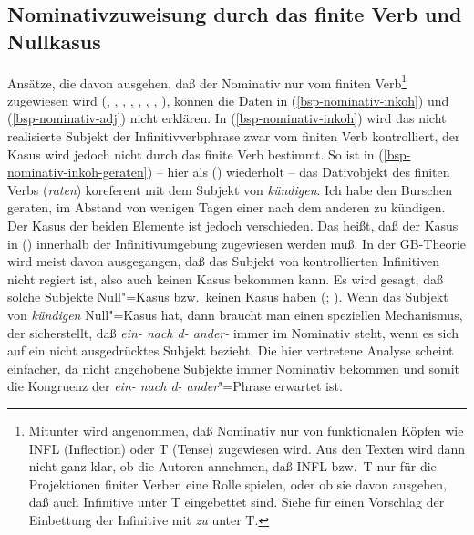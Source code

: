 \subsection{Nominativzuweisung durch das finite Verb und Nullkasus}
\label{sec-kasus-fin-verb-nullkasus}

Ansätze, die davon ausgehen, daß der Nominativ nur vom finiten Verb\footnote{
  Mitunter wird angenommen, daß Nominativ nur von funktionalen Köpfen wie INFL (Inflection) oder T (Tense) zugewiesen
  wird. Aus den Texten wird dann nicht ganz klar, ob die Autoren annehmen, daß INFL bzw.\ T nur für
  die Projektionen finiter Verben eine Rolle spielen, oder ob sie davon ausgehen, daß auch
  Infinitive unter T eingebettet sind. Siehe \citet[]{Wurmbrand2003a} für einen Vorschlag der Einbettung
  der Infinitive mit \emph{zu} unter T.%
} zugewiesen wird
%
(\citealp[]{Chomsky93a}, \citealp[]{Haider84b}, \citealp[]{FF87a},
\citealp[]{Bierwisch90a}, \citealp{Molnarfi98a},
\citealp*[]{BBM2001a}, \citealp[]{Eroms2000a}, \citealp[, , ]{Abraham2005a}), 
können die Daten in (\ref{bsp-nominativ-inkoh}) und (\ref{bsp-nominativ-adj}) nicht erklären.
In (\ref{bsp-nominativ-inkoh}) wird das nicht realisierte Subjekt der Infinitivverbphrase
zwar vom finiten Verb kontrolliert, der Kasus wird jedoch nicht durch das finite Verb
bestimmt. So ist \zb in (\ref{bsp-nominativ-inkoh-geraten}) -- hier als () wiederholt -- das Dativobjekt 
des finiten Verbs (\emph{raten}) koreferent mit dem Subjekt von \emph{kündigen}. 
\ea
Ich habe den Burschen geraten, im Abstand von wenigen Tagen einer nach dem anderen zu kündigen.
\z
Der Kasus der beiden Elemente ist jedoch verschieden. Das heißt, daß der Kasus in ()
innerhalb der Infinitivumgebung zugewiesen werden muß. In der GB-Theorie wird meist davon
ausgegangen, daß das Subjekt von kontrollierten Infinitiven nicht regiert ist, also auch
keinen Kasus bekommen kann. Es wird gesagt, daß solche Subjekte Null"=Kasus bzw.\ keinen Kasus
haben (\citealp[]{Grewendorf88a}; \citealp[]{Frey93a}).
Wenn das Subjekt von \emph{kündigen} Null"=Kasus hat,
dann braucht man einen speziellen Mechanismus, der sicherstellt,
daß {\em ein- nach d- ander-\/} immer im Nominativ steht, wenn es sich auf ein nicht 
ausgedrücktes Subjekt bezieht. Die hier vertretene Analyse scheint einfacher,
da nicht angehobene Subjekte immer Nominativ bekommen und somit
die Kongruenz der \emph{ein- nach d- ander}"=Phrase erwartet ist.




